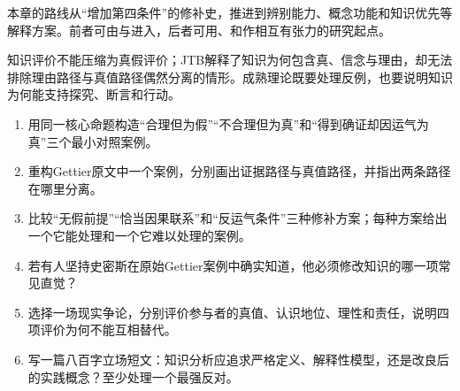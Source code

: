 本章的路线从“增加第四条件”的修补史，推进到辨别能力、概念功能和知识优先等解释方案。前者可由\textcite{lehrer1969}与\textcite{goldman1976}进入，后者可用\textcite{craig1990}、\textcite{williamson2000}和\textcite{greco2010}作相互有张力的研究起点。

\begin{checkpoint}
知识评价不能压缩为真假评价；JTB解释了知识为何包含真、信念与理由，却无法排除理由路径与真值路径偶然分离的情形。成熟理论既要处理反例，也要说明知识为何能支持探究、断言和行动。
\end{checkpoint}

\begin{exercises}
\begin{enumerate}
  \item 用同一核心命题构造“合理但为假”“不合理但为真”和“得到确证却因运气为真”三个最小对照案例。
  \item 重构Gettier原文中一个案例，分别画出证据路径与真值路径，并指出两条路径在哪里分离。
  \item 比较“无假前提”“恰当因果联系”和“反运气条件”三种修补方案；每种方案给出一个它能处理和一个它难以处理的案例。
  \item 若有人坚持史密斯在原始Gettier案例中确实知道，他必须修改知识的哪一项常见直觉？
  \item 选择一场现实争论，分别评价参与者的真值、认识地位、理性和责任，说明四项评价为何不能互相替代。
  \item 写一篇八百字立场短文：知识分析应追求严格定义、解释性模型，还是改良后的实践概念？至少处理一个最强反对。
\end{enumerate}
\end{exercises}

\clearpage
\begin{readingmap}
\end{readingmap}
